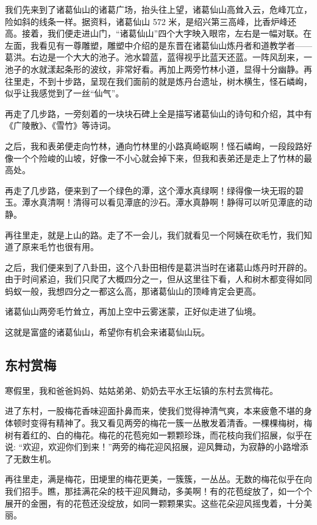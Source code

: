 \documentclass[UTF8,a4paper,titlepage,twoside,10.5pt]{article}
\begin{document}
我们先来到了诸葛仙山的诸葛广场，抬头往上望，诸葛仙山高耸入云，危峰兀立，险如斜的线条一样。据资料，诸葛仙山 572 米，是绍兴第三高峰，比香炉峰还高。接着，我们便走进山门，“诸葛仙山”四个大字映入眼帘，左右是一幅对联。在左面，我看见有一尊雕塑，雕塑中介绍的是东晋在诸葛仙山炼丹者和道教学者——葛洪。右边是一个大大的池子。池水碧蓝，蓝得视乎比蓝天还蓝。一阵风刮来，一池子的水就漾起条形的波纹，非常好看。再加上两旁竹林小道，显得十分幽静。再往里走，不到十步路，呈现在我们面前的就是炼丹台遗址，树木横生，怪石嶙峋，似乎让我感觉到了一丝“仙气”。

再走了几步路，一旁刻着的一块块石碑上全是描写诸葛仙山的诗句和介绍，其中有《广陵散》、《雪竹》等诗词。

之后，我和表弟便走向竹林，通向竹林里的小路真崎岖啊！怪石嶙峋，一段段路好像一个个险峻的山坡，好像一不小心就会掉下来，但我和表弟还是走上了竹林的最高处。

再走了几步路，便来到了一个绿色的潭，这个潭水真绿啊！绿得像一块无瑕的碧玉。潭水真清啊！清得可以看见潭底的沙石。潭水真静啊！静得可以听见潭底的动静。

再往里走，就是上山的路。走了不一会儿，我们就看见一个阿姨在砍毛竹，我们知道了原来毛竹也很有用。

之后，我们便来到了八卦田，这个八卦田相传是葛洪当时在诸葛山炼丹时开辟的。由于时间紧迫，我们只爬了大概四分之一，但从这里往下看，人和树木都变得如同蚂蚁一般，我想四分之一都这么高，那诸葛仙山的顶峰肯定会更高。

诸葛仙山两旁毛竹耸立，再加上空中云雾迷蒙，正好似走进了仙境。

这就是富盛的诸葛仙山，希望你有机会来诸葛仙山玩。

\subsection{东村赏梅}
\label{sec:org58aacba}

寒假里，我和爸爸妈妈、姑姑弟弟、奶奶去平水王坛镇的东村去赏梅花。

进了东村，一股梅花香味迎面扑鼻而来，使我们觉得神清气爽，本来疲惫不堪的身体顿时变得有精神了。我又看见两旁的梅花一簇一丛散发着清香。一棵棵梅树，梅树有着红的、白的梅花。梅花的花苞宛如一颗颗珍珠，而花枝向我们招展，似乎在说: “欢迎，欢迎你们到来！”两旁的梅花迎风招展，迎风舞动，为寂静的小路增添了无数生机。

再往里走，满是梅花，田埂里的梅花更美，一簇簇，一丛丛。无数的梅花似乎在向我们招手。瞧，那挂满花朵的枝干迎风舞动，多美啊！有的花苞绽放了，如一个个展开的金圈，有的花苞还没绽放，如同一颗颗果实。这些花朵迎风摇曳着，十分美丽。
\end{document}
